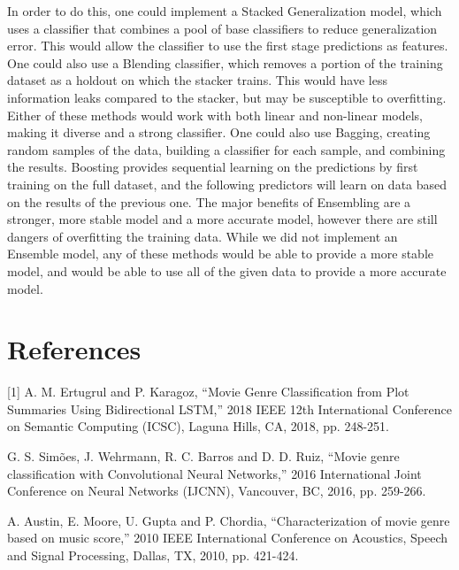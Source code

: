 \documentclass[sigconf]{acmart}
\begin{document}
In order to do this, one could implement a Stacked Generalization model, which uses a classifier that combines a pool of base classifiers to reduce generalization error. This would allow the classifier to use the first stage predictions as features. One could also use a Blending classifier, which removes a portion of the training dataset as a holdout on which the stacker trains. This would have less information leaks compared to the stacker, but may be susceptible to overfitting. Either of these methods would work with both linear and non-linear models, making it diverse and a strong classifier. One could also use Bagging, creating random samples of the data, building a classifier for each sample, and combining the results. Boosting provides sequential learning on the predictions by first training on the full dataset, and the following predictors will learn on data based on the results of the previous one. The major benefits of Ensembling are a stronger, more stable model and a more accurate model, however there are still dangers of overfitting the training data. While we did not implement an Ensemble model, any of these methods would be able to provide a more stable model, and would be able to use all of the given data to provide a more accurate model.

\section{References}

[1] A. M. Ertugrul and P. Karagoz, ``Movie Genre Classification from Plot Summaries Using Bidirectional LSTM,'' 2018 IEEE 12th International Conference on Semantic Computing (ICSC), Laguna Hills, CA, 2018, pp. 248-251.

\noindent[2] G. S. Simões, J. Wehrmann, R. C. Barros and D. D. Ruiz, ``Movie genre classification with Convolutional Neural Networks,'' 2016 International Joint Conference on Neural Networks (IJCNN), Vancouver, BC, 2016, pp. 259-266.

\noindent[3] A. Austin, E. Moore, U. Gupta and P. Chordia, ``Characterization of movie genre based on music score,'' 2010 IEEE International Conference on Acoustics, Speech and Signal Processing, Dallas, TX, 2010, pp. 421-424.
\end{document}
